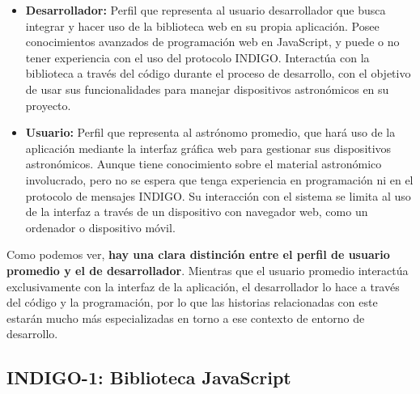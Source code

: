 \begin{itemize}
	\item \textbf{Desarrollador:} Perfil que representa al usuario desarrollador que busca integrar y hacer uso de la biblioteca web en su propia aplicación. Posee conocimientos avanzados de programación web en JavaScript, y puede o no tener experiencia con el uso del protocolo INDIGO. Interactúa con la biblioteca a través del código durante el proceso de desarrollo, con el objetivo de usar sus funcionalidades para manejar dispositivos astronómicos en su proyecto.
	\item \textbf{Usuario:} Perfil que representa al astrónomo promedio, que hará uso de la aplicación mediante la interfaz gráfica web para gestionar sus dispositivos astronómicos. Aunque tiene conocimiento sobre el material astronómico involucrado, pero no se espera que tenga experiencia en programación ni en el protocolo de mensajes INDIGO. Su interacción con el sistema se limita al uso de la interfaz a través de un dispositivo con navegador web, como un ordenador o dispositivo móvil.
\end{itemize}
 
Como podemos ver, \textbf{hay una clara distinción entre el perfil de usuario promedio y el de desarrollador}. Mientras que el usuario promedio interactúa exclusivamente con la interfaz de la aplicación, el desarrollador lo hace a través del código y la programación, por lo que las historias relacionadas con este estarán mucho más especializadas en torno a ese contexto de entorno de desarrollo. 

\subsection{INDIGO-1: Biblioteca JavaScript}

